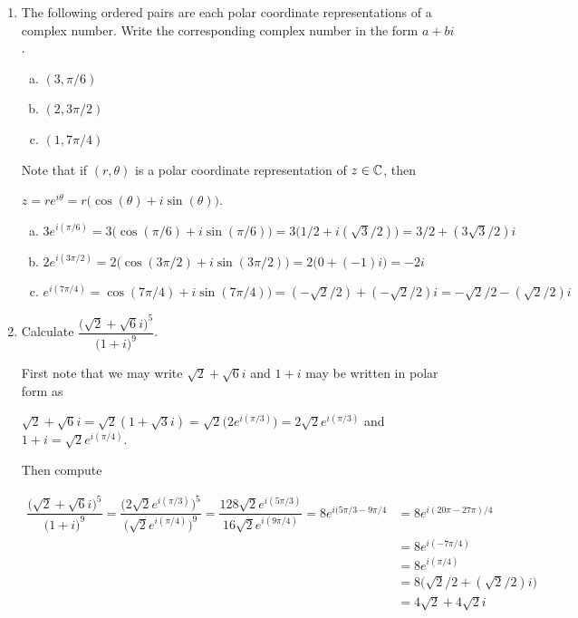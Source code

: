 \documentclass[11pt,fleqn,dvipsnames,usenames]{article}
\begin{document}
\begin{enumerate}
\item The following ordered pairs are each polar coordinate representations of a complex number.  Write the corresponding complex number in the form $a + bi$.
\begin{multicols}{3}
\begin{enumerate}[(a)]
\item $(3, \pi/6)$
\item $(2, 3\pi/2)$
\item $(1, 7\pi/4)$
\end{enumerate}
\end{multicols}
\vsmsp

\solution Note that if $(r,\theta)$ is a polar coordinate representation of $z\in \mathbb{C}$, then
\begin{center}
$z = re^{i\theta} = r\big(\cos(\theta) + i\sin(\theta)\big)$.
\end{center}

\begin{enumerate}[(a)]
\item $3e^{i(\pi/6)} = 3\big(\cos(\pi/6) + i\sin(\pi/6)\big) = 3\big(1/2 + i(\sqrt{3}/2)\big) = 3/2 + (3\sqrt{3}/2)i$
\item $2e^{i(3\pi/2)} = 2\big(\cos(3\pi/2) + i\sin(3\pi/2)\big) = 2\big(0 + (-1)i\big) = -2i$
\item $e^{i(7\pi/4)} = \cos(7\pi/4) + i\sin(7\pi/4)\big) = (-\sqrt{2}/2) + (-\sqrt{2}/2)i = -\sqrt{2}/2 - (\sqrt{2}/2)i$
\end{enumerate}

\item Calculate $\dfrac{\big(\sqrt{2} + \sqrt{6}i\big)^5}{\big(1+i\big)^9}$.
\vsmsp

\solution First note that we may write $\sqrt{2} + \sqrt{6}i$ and $1+i$ may be written in polar form as
\begin{center}
$\sqrt{2} + \sqrt{6}i = \sqrt{2}(1 + \sqrt{3}i) = \sqrt{2}\big(2e^{i(\pi/3)}\big) = 2\sqrt{2}e^{i(\pi/3)}$ and $1+i = \sqrt{2}e^{i(\pi/4)}$.
\end{center}
Then compute

\begin{align*}
\dfrac{\big(\sqrt{2} + \sqrt{6}i\big)^5}{\big(1+i\big)^9} = \dfrac{\big(2\sqrt{2}e^{i(\pi/3)}\big)^5}{\big(\sqrt{2}e^{i(\pi/4)}\big)^9} = \dfrac{128\sqrt{2}e^{i(5\pi/3)}}{16\sqrt{2}e^{i(9\pi/4)}} = 8e^{i(5\pi/3 - 9\pi/4} &= 8e^{i(20\pi - 27\pi)/4}\\
&= 8e^{i(-7\pi/4)}\\
&= 8e^{i(\pi/4)}\\
&= 8\big(\sqrt{2}/2 + (\sqrt{2}/2)i\big)\\
&= 4\sqrt{2} + 4\sqrt{2}i
\end{align*}


\end{enumerate}
\end{document}
